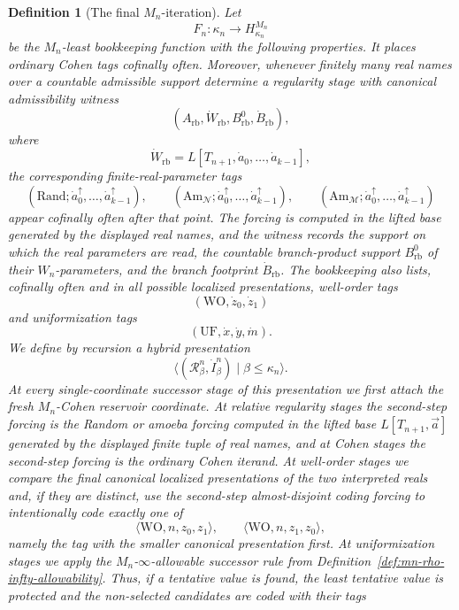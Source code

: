 \documentclass[a4paper,11pt]{article}
\newtheorem{definition}[theorem]{Definition}
\begin{document}
\begin{definition}[The final $M_n$-iteration]\label{def:main-iteration-mn}
Let
\[
   F_n:\kappa_n\longrightarrow H_{\kappa_n}^{M_n}
\]
be the \(M_n\)-least bookkeeping function with the following properties.  It
places ordinary Cohen tags cofinally often.  Moreover, whenever finitely many
real names over a countable admissible support determine a regularity stage with
canonical admissibility witness
\[
   (A_{\mathrm{rb}},\dot W_{\mathrm{rb}},B^0_{\mathrm{rb}},\dot B_{\mathrm{rb}}),
\]
where
\[
   \dot W_{\mathrm{rb}}=L[T_{n+1},\dot a_0,\ldots,
      \dot a_{k-1}],
\]
the corresponding finite-real-parameter tags
\[
   (\mathrm{Rand};\dot a_0^{\uparrow},\ldots,
      \dot a_{k-1}^{\uparrow}),
   \qquad
   (\mathrm{Am}_{\mathcal N};\dot a_0^{\uparrow},\ldots,
      \dot a_{k-1}^{\uparrow}),
   \qquad
   (\mathrm{Am}_{\mathcal M};\dot a_0^{\uparrow},\ldots,
      \dot a_{k-1}^{\uparrow})
\]
appear cofinally often after that point.  The forcing is computed in the lifted
base generated by the displayed real names, and the witness records the support
on which the real parameters are read, the countable branch-product support
\(B^0_{\mathrm{rb}}\) of their \(W_n\)-parameters, and the branch footprint
\(\dot B_{\mathrm{rb}}\).  The bookkeeping also lists, cofinally often and in all
possible localized presentations, well-order tags
\[
   (\mathrm{WO},\dot z_0,
   \dot z_1)
\]
and uniformization tags
\[
   (\mathrm{UF},\dot x,
   \dot y,
   \dot m).
\]
We define by recursion a hybrid presentation
\[
   \langle (\mathcal R^n_\beta,\dot I^n_\beta)
      \mid \beta\leq\kappa_n\rangle .
\]
At every single-coordinate successor stage of this presentation we first attach the fresh $M_n$-Cohen reservoir coordinate.  At relative regularity stages the second-step forcing is the Random or amoeba forcing computed in the lifted base \(L[T_{n+1},\vec a]\) generated by the displayed finite tuple of real names, and at Cohen stages the second-step forcing is the ordinary Cohen iterand.  At well-order stages we compare the final canonical localized presentations of the two interpreted reals and, if they are distinct, use the second-step almost-disjoint coding forcing to intentionally code exactly one of
\[
   \langle\mathrm{WO},n,z_0,z_1\rangle,
   \qquad
   \langle\mathrm{WO},n,z_1,z_0\rangle,
\]
namely the tag with the smaller canonical presentation first.  At uniformization stages we apply the $M_n$-$\infty$-allowable successor rule from Definition~\ref{def:mn-rho-infty-allowability}.  Thus, if a tentative value is found, the least tentative value is protected and the non-selected candidates are coded with their tags

\end{definition}
\end{document}
